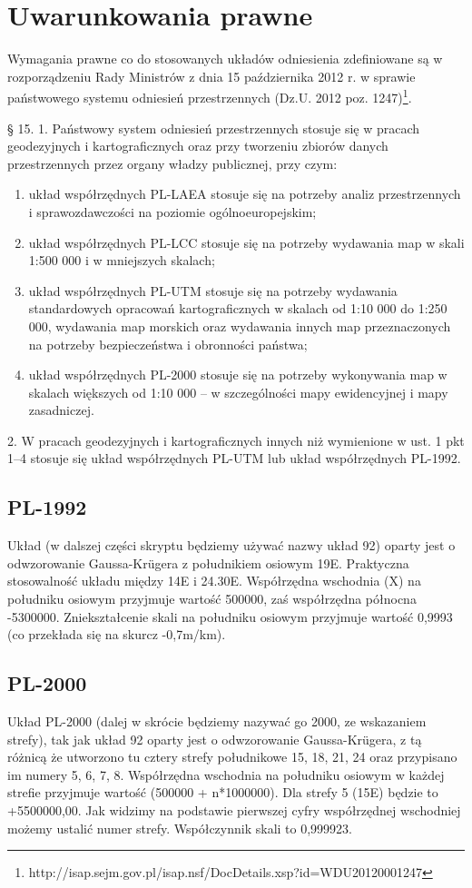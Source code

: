 \documentclass[a4paper,11pt, onecolumn, openany]{memoir}
\begin{document}
		\section{Uwarunkowania prawne}
		Wymagania prawne co do stosowanych układów odniesienia zdefiniowane są w rozporządzeniu Rady Ministrów z dnia 15 października 2012 r. w sprawie państwowego systemu odniesień przestrzennych (Dz.U. 2012 poz. 1247)\footnote{http://isap.sejm.gov.pl/isap.nsf/DocDetails.xsp?id=WDU20120001247}.
\begin{tcolorbox}[colback=black!5!white,colframe=white!55!black,title=§ 15. 1 i 2 rozporządzenia]
	§ 15. 1. Państwowy system odniesień przestrzennych stosuje się w pracach geodezyjnych i kartograficznych oraz przy
tworzeniu zbiorów danych przestrzennych przez organy władzy publicznej, przy czym:
\begin{enumerate}
	\item układ współrzędnych PL-LAEA stosuje się na potrzeby analiz przestrzennych i sprawozdawczości na poziomie ogólnoeuropejskim;
	\item układ współrzędnych PL-LCC stosuje się na potrzeby wydawania map w skali 1:500 000 i w mniejszych skalach;
	\item układ współrzędnych PL-UTM stosuje się na potrzeby wydawania standardowych opracowań kartograficznych w skalach od 1:10 000 do 1:250 000, wydawania map morskich oraz wydawania innych map przeznaczonych na potrzeby
	bezpieczeństwa i obronności państwa;
	\item układ współrzędnych PL-2000 stosuje się na potrzeby wykonywania map w skalach większych od 1:10 000 – w szczególności mapy ewidencyjnej i mapy zasadniczej.
\end{enumerate}
2. W pracach geodezyjnych i kartograficznych innych niż wymienione w ust. 1 pkt 1–4 stosuje się układ współrzędnych
PL-UTM lub układ współrzędnych PL-1992.
\end{tcolorbox}
			\subsection{PL-1992}
			Układ (w dalszej części skryptu będziemy używać nazwy układ 92) oparty jest o odwzorowanie Gaussa-Kr\"ugera z południkiem osiowym 19E. Praktyczna stosowalność układu między 14E i 24.30E. Współrzędna wschodnia (X) na południku osiowym przyjmuje wartość 500000, zaś współrzędna północna -5300000. Zniekształcenie skali na południku osiowym przyjmuje wartość 0,9993 (co przekłada się na skurcz -0,7m/km).
			\subsection{PL-2000}
			Układ PL-2000 (dalej w skrócie będziemy nazywać go 2000, ze wskazaniem strefy), tak jak układ 92 oparty jest o odwzorowanie Gaussa-Kr\"ugera, z tą różnicą że utworzono tu cztery strefy południkowe 15, 18, 21, 24 oraz przypisano im numery 5, 6, 7, 8. Współrzędna wschodnia na południku osiowym w każdej strefie przyjmuje wartość (500000 + n*1000000). Dla strefy 5 (15E) będzie to +5500000,00. Jak widzimy na podstawie pierwszej cyfry współrzędnej wschodniej możemy ustalić numer strefy. Współczynnik skali to 0,999923.
\end{document}
